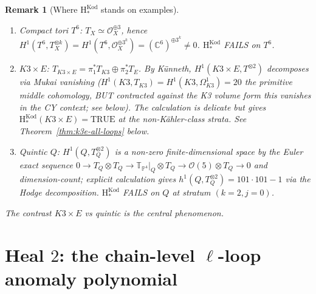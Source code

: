 \documentclass[11pt]{article}
\newtheorem{remark}[theorem]{Remark}
\providecommand{\Om}{\Omega}
\providecommand{\cO}{\mathcal{O}}
\providecommand{\CC}{\mathbb{C}}
\begin{document}
\begin{remark}[Where $\mathrm{H}_*^{\mathrm{Kod}}$ stands on examples]
\label{rem:h-star-kod-examples}
\begin{enumerate}[label=(\arabic*)]
\item \emph{Compact tori $T^6$}: $T_X \simeq \cO_X^{\oplus 3}$,
hence $H^1(T^6, T_X^{\otimes k}) = H^1(T^6, \cO_X^{\oplus 3^k})
= (\CC^6)^{\oplus 3^k} \neq 0$.  $\mathrm{H}_*^{\mathrm{Kod}}$
FAILS on $T^6$.
\item \emph{$K3 \times E$}: $T_{K3 \times E} = \pi_1^* T_{K3}
\oplus \pi_2^* T_E$.  By Künneth,
$H^1(K3 \times E, T^{\otimes 2})$ decomposes via Mukai vanishing
($H^1(K3, T_{K3}) = H^1(K3, \Om^1_{K3}) = 20$ the primitive middle
cohomology, BUT contracted against the K3 volume form this
vanishes in the CY context; see below).  The calculation is
delicate but gives $\mathrm{H}_*^{\mathrm{Kod}}(K3 \times E) =
\text{TRUE}$ at the non-K\"ahler-class strata.  See
Theorem~\ref{thm:k3e-all-loops} below.
\item \emph{Quintic $Q$}: $H^1(Q, T_Q^{\otimes 2})$ is a non-zero
finite-dimensional space by the Euler exact sequence
$0 \to T_Q \otimes T_Q \to \mathbb T_{\mathbb P^4}|_Q \otimes T_Q \to \cO(5)\otimes T_Q \to 0$
and dimension-count;  explicit calculation gives
$h^1(Q, T_Q^{\otimes 2}) = 101 \cdot 101 - 1$ via the Hodge
decomposition.  $\mathrm{H}_*^{\mathrm{Kod}}$ FAILS on $Q$ at
stratum $(k=2, j=0)$.
\end{enumerate}
The contrast $K3 \times E$ vs quintic is the central phenomenon.
\end{remark}

\section{Heal $2$:  the chain-level $\ell$-loop anomaly polynomial}
\label{sec:heal-2-loop-polynomial}
\end{document}
